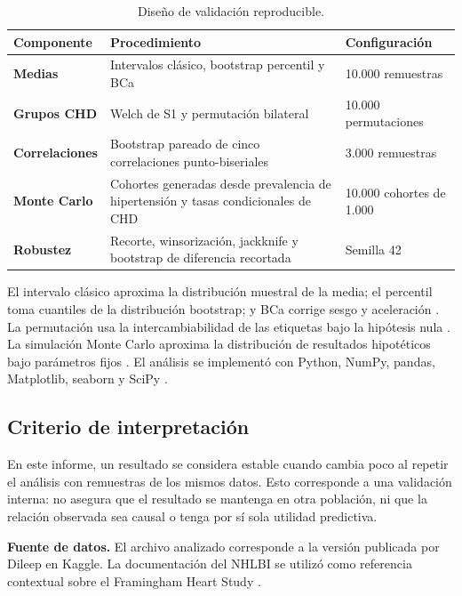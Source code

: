 \documentclass[10pt,a4paper]{article}
\begin{document}
\begin{table}[H]
\centering\small
\renewcommand{\arraystretch}{1.18}
\begin{tabularx}{\textwidth}{>{\bfseries}p{3.2cm} X p{3.0cm}}
\toprule
Componente & Procedimiento & Configuración \\
\midrule
Medias & Intervalos clásico, bootstrap percentil y BCa & 10.000 remuestras \\
Grupos CHD & Welch de S1 y permutación bilateral & 10.000 permutaciones \\
Correlaciones & Bootstrap pareado de cinco correlaciones punto-biseriales & 3.000 remuestras \\
Monte Carlo & Cohortes generadas desde prevalencia de hipertensión y tasas condicionales de CHD & 10.000 cohortes de 1.000 \\
Robustez & Recorte, winsorización, jackknife y bootstrap de diferencia recortada & Semilla 42 \\
\bottomrule
\end{tabularx}
\caption{Diseño de validación reproducible.}
\end{table}

El intervalo clásico aproxima la distribución muestral de la media; el
percentil toma cuantiles de la distribución bootstrap; y BCa corrige sesgo y
aceleración \cite{efron1987,efron1993}. La permutación usa la
intercambiabilidad de las etiquetas bajo la hipótesis nula \cite{good2005}.
La simulación Monte Carlo aproxima la distribución de resultados hipotéticos
bajo parámetros fijos \cite{robert2004}. El análisis se implementó con
Python, NumPy, pandas, Matplotlib, seaborn y SciPy \cite{virtanen2020}.

\subsection{Criterio de interpretación}

En este informe, un resultado se considera estable cuando cambia poco al
repetir el análisis con remuestras de los mismos datos. Esto corresponde a
una validación interna: no asegura que el resultado se mantenga en otra
población, ni que la relación observada sea causal o tenga por sí sola
utilidad predictiva.

\vfill
\textbf{Fuente de datos.} El archivo analizado corresponde a la versión
publicada por Dileep en Kaggle. La documentación del NHLBI se utilizó como
referencia contextual sobre el Framingham Heart Study \cite{dileep,nhlbi}.
\newpage
\end{document}
